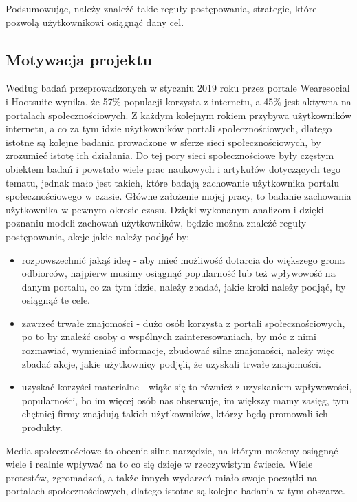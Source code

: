 \documentclass[polish,12pt]{aghthesis}
\begin{document}
Podsumowując, należy znaleźć takie reguły postępowania, strategie, które pozwolą użytkownikowi osiągnąć dany cel. 

\subsection{Motywacja projektu}
Według badań przeprowadzonych w styczniu 2019 roku przez portale Wearesocial i Hootsuite \cite{wearesocial} wynika, że 57\% populacji korzysta z internetu, a 45\% jest aktywna na portalach społecznościowych. Z każdym kolejnym rokiem przybywa użytkowników internetu, a co za tym idzie użytkowników portali społecznościowych, dlatego istotne są kolejne badania prowadzone w sferze sieci społecznościowych, by zrozumieć istotę ich działania. Do tej pory sieci społecznościowe były częstym obiektem badań i powstało wiele prac naukowych i artykułów dotyczących tego tematu, jednak mało jest takich, które badają zachowanie użytkownika portalu społecznościowego w czasie. Główne założenie mojej pracy, to badanie zachowania użytkownika w pewnym okresie czasu. Dzięki wykonanym analizom i dzięki poznaniu modeli zachowań użytkowników, będzie można znaleźć reguły postępowania, akcje jakie należy podjąć by:
\begin{itemize}
    \item rozpowszechnić jakąś ideę - aby mieć możliwość dotarcia do większego grona odbiorców, najpierw musimy osiągnąć popularność lub też wpływowość na danym portalu, co za tym idzie, należy zbadać, jakie kroki należy podjąć, by osiągnąć te cele.
    \item zawrzeć trwałe znajomości - dużo osób korzysta z portali społecznościowych, po to by znaleźć osoby o wspólnych zainteresowaniach, by móc z nimi rozmawiać, wymieniać informacje, zbudować silne znajomości, należy więc zbadać akcje, jakie użytkownicy podjęli, że uzyskali trwałe znajomości.
    \item uzyskać korzyści materialne - wiąże się to również z uzyskaniem wpływowości, popularności, bo im więcej osób nas obserwuje, im większy mamy zasięg, tym chętniej firmy znajdują takich użytkowników, którzy będą promowali ich produkty.
\end{itemize}

Media społecznościowe to obecnie silne narzędzie, na którym możemy osiągnąć wiele i realnie wpływać na to co się dzieje w rzeczywistym świecie. Wiele protestów, zgromadzeń, a także innych wydarzeń miało swoje początki na portalach społecznościowych, dlatego istotne są kolejne badania w tym obszarze.
\end{document}

